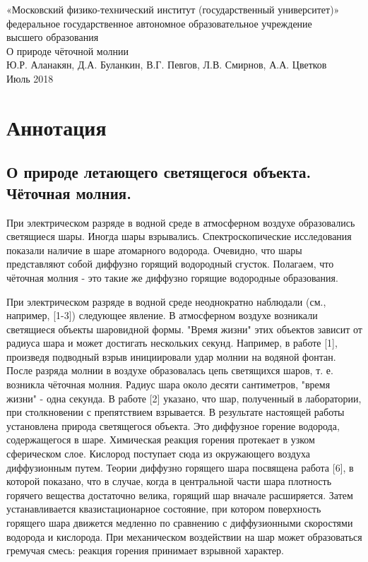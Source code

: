 \documentclass[a4paper]{article}
\begin{document}
\begin{center}
\large{«Московский физико-технический институт (государственный университет)»}\\
\footnotesize{федеральное государственное автономное образовательное учреждение}\\ 
\footnotesize{высшего образования}\\
 \hfill \break
\hfill\break
\hfill \break
\hfill \break
\hfill \break
\large{О природе чёточной молнии}\\
\hfill \break
\hfill \break
\hfill \break
\hfill \break
\large{Ю.Р. Аланакян, Д.А. Буланкин, В.Г. Певгов, Л.В. Смирнов, А.А. Цветков}\\
\hfill \break
\hfill \break
\hfill \break
\hfill \break
\hfill \break
\normalsize{Июль 2018} 
\end{center}

\newpage

\section{Аннотация}
\subsection{О природе летающего светящегося объекта. Чёточная молния.}

При электрическом разряде в водной среде в атмосферном воздухе образовались светящиеся шары. Иногда шары взрывались. Спектроскопические исследования показали наличие в шаре атомарного водорода. Очевидно, что шары представляют собой диффузно горящий водородный сгусток. Полагаем, что чёточная молния - это такие же диффузно горящие водородные образования.

При электрическом разряде в водной среде неоднократно наблюдали (см., например, [1-3]) следующее явление. В атмосферном воздухе возникали светящиеся объекты шаровидной формы. "Время жизни" этих объектов зависит от радиуса шара и может достигать нескольких секунд. Например, в работе [1], произведя подводный взрыв инициировали удар молнии на водяной фонтан. После разряда молнии в воздухе образовалась цепь светящихся шаров, т. е. возникла чёточная молния. Радиус шара около десяти сантиметров, "время жизни" - одна секунда. В работе [2] указано, что шар, полученный в лаборатории, при столкновении с препятствием взрывается. В результате настоящей работы установлена природа светящегося объекта. Это диффузное горение водорода, содержащегося в шаре. Химическая реакция горения протекает в узком сферическом слое. Кислород поступает сюда из окружающего воздуха диффузионным путем. Теории диффузно горящего шара посвящена работа [6], в которой показано, что в случае, когда в центральной части шара плотность горячего вещества достаточно велика, горящий шар вначале расширяется. Затем устанавливается квазистационарное состояние, при котором поверхность горящего шара движется медленно по сравнению с диффузионными скоростями водорода и кислорода. При механическом воздействии на шар может образоваться гремучая смесь: реакция горения принимает взрывной характер.
\end{document}

